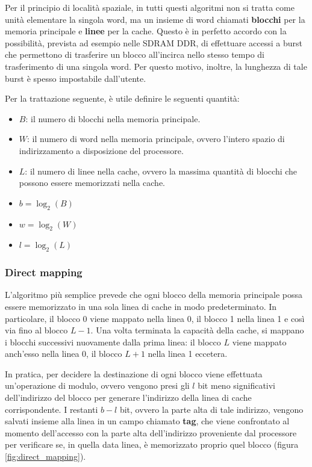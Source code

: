 \documentclass[11pt,4paper]{report}
\begin{document}
Per il principio di località spaziale, in tutti questi algoritmi non si tratta come unità elementare la singola word, ma un insieme di word chiamati \textbf{blocchi} per la memoria principale e \textbf{linee} per la cache. Questo è in perfetto accordo con la possibilità, prevista ad esempio nelle SDRAM DDR, di effettuare accessi a burst che permettono di trasferire un blocco all'incirca nello stesso tempo di trasferimento di una singola word. Per questo motivo, inoltre, la lunghezza di tale burst è spesso impostabile dall'utente.

Per la trattazione seguente, è utile definire le seguenti quantità:
\begin{itemize}
\item $B$: il  numero di blocchi nella memoria principale.
\item $W$: il numero di word nella memoria principale, ovvero l'intero spazio di indirizzamento a disposizione del processore.
\item $L$: il numero di linee nella cache, ovvero la massima quantità di blocchi che possono essere memorizzati nella cache.
\item $b = \log_2(B)$
\item $w = \log_2(W)$
\item $l = \log_2(L)$
\end{itemize}

\subsubsection{Direct mapping}
L'algoritmo più semplice prevede che ogni blocco della memoria principale possa essere memorizzato in una sola linea di cache in modo predeterminato. In particolare, il blocco 0 viene mappato nella linea 0, il blocco 1 nella linea 1 e così via fino al blocco $L-1$. Una volta terminata la capacità della cache, si mappano i blocchi successivi nuovamente dalla prima linea: il blocco $L$ viene mappato anch'esso nella linea 0, il blocco $L+1$ nella linea 1 eccetera. 

In pratica, per decidere la destinazione di ogni blocco viene effettuata un'operazione di modulo, ovvero vengono presi gli $l$ bit meno significativi dell'indirizzo del blocco per generare l'indirizzo della linea di cache corrispondente. I restanti $b-l$ bit, ovvero la parte alta di tale indirizzo, vengono salvati insieme alla linea in un campo chiamato \textbf{tag}, che viene confrontato al momento dell'accesso con la parte alta dell'indirizzo proveniente dal processore per verificare se, in quella data linea, è memorizzato proprio quel blocco (figura \ref{fig:direct_mapping}).
\end{document}
